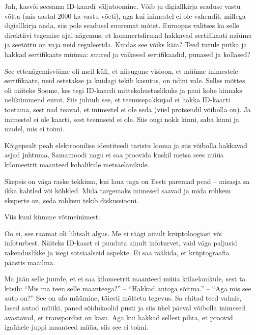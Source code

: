 Jah, kasvõi seesama ID-kaardi väljatoomine. Võib ju digiallkirja seaduse vastu 
võtta (mis aastal 2000 ka vastu võeti), aga kui inimestel ei ole vahendit, 
millega digiallkirja anda, siis pole seadusel suuremat mõtet. 
Euroopas valitses ka selle direktiivi tegemise ajal nägemus, et 
kommertsfirmad hakkavad sertifikaati müüma ja seetõttu on vaja neid 
reguleerida. Kuidas see võiks käia? Teed turule putka ja hakkad sertifikaate 
müüma: suured ja väikesed sertifikaadid, punased ja kollased? 

See ettenägemisvõime oli meil küll, et niisugune visioon, et müüme inimestele 
sertifikaate, neid ostetakse ja kuidagi tekib kasutus, on üdini vale. Selles mõttes oli näiteks Soome, kes tegi ID-kaardi 
mittekohustuslikuks ja pani kohe hinnaks nelikümmend eurot. Siis juhtub see, et teenusepakkujad ei hakka ID-kaarti toetama, sest 
nad teavad, et inimestel ei ole seda (viiel protsendil võibolla on). Ja inimestel ei ole kaarti, sest teenuseid ei 
ole. Siis ongi nokk kinni, saba kinni ja mudel, mis ei toimi. 

Kõigepealt peab elektroonilise identiteedi 
taristu looma ja siis võibolla hakkavad asjad juhtuma. Samamoodi nagu ei 
saa proovida kuskil metsa sees müüa kilomeetrit maanteed kohalikule 
metsaelanikule. 


Skepsis on väga raske tekkima, kui laua taga on Eesti paremad pead -- misasja sa ikka kahtled või kõhkled. Mida targemaks inimesed saavad ja 
mida rohkem eksperte on, seda rohkem tekib diskussiooni. 


Viis kuni kümme võtmeinimest.


Oo ei, see raamat oli lihtsalt algus. Me ei räägi ainult 
krüptoloogiast või infoturbest. Näiteks ID-kaart ei puuduta ainult 
infoturvet, vaid väga paljusid rakenduslikke ja isegi sotsiaalseid aspekte. Ei saa rääkida, et krüptograafia päästis maailma. 


Ma jään selle juurde, et ei saa kilomeetrit maanteed müüa 
külaelanikule, sest ta küsib: \enquote{Mis ma teen selle maanteega?} -- 
\enquote{Hakkad autoga sõitma.} -- \enquote{Aga mis see auto on?} See on 
ufo müümine, täiesti mõttetu tegevus. Sa ehitad teed valmis, lased autod müüki, 
paned sõidukoolid püsti ja siis ühel päeval võibolla inimesed avastavad, et 
transpordist on kasu. Aga kui hakkad sellest pihta, et proovid 
igaühele juppi maanteed müüa, siis see ei toimi. 


